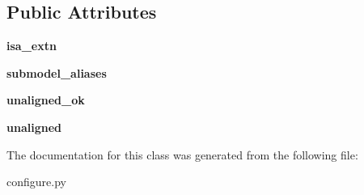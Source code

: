 \subsection*{Public Attributes}
\begin{DoxyCompactItemize}
\item 
\hypertarget{classconfigure_1_1ArchInfo_a21f7da215f80bea025ce78cefbcdcb6c}{{\bfseries isa\-\_\-extn}}\label{classconfigure_1_1ArchInfo_a21f7da215f80bea025ce78cefbcdcb6c}

\item 
\hypertarget{classconfigure_1_1ArchInfo_a0ab24e93cd9e2adfc6dfc42c91830e24}{{\bfseries submodel\-\_\-aliases}}\label{classconfigure_1_1ArchInfo_a0ab24e93cd9e2adfc6dfc42c91830e24}

\item 
\hypertarget{classconfigure_1_1ArchInfo_aef22934754b9397babc16df1d577f92b}{{\bfseries unaligned\-\_\-ok}}\label{classconfigure_1_1ArchInfo_aef22934754b9397babc16df1d577f92b}

\item 
\hypertarget{classconfigure_1_1ArchInfo_a8794ab94c115f8d47de7122aa71eb9c0}{{\bfseries unaligned}}\label{classconfigure_1_1ArchInfo_a8794ab94c115f8d47de7122aa71eb9c0}

\end{DoxyCompactItemize}


The documentation for this class was generated from the following file\-:\begin{DoxyCompactItemize}
\item 
configure.\-py\end{DoxyCompactItemize}
